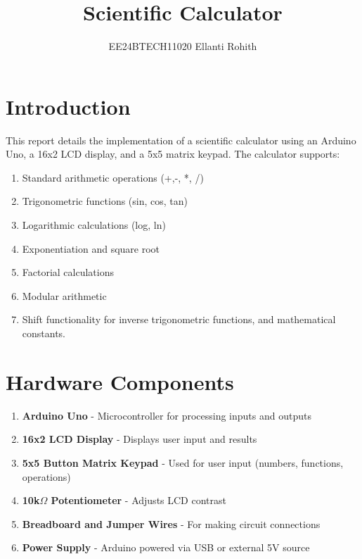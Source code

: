 \documentclass[journal,12pt,onecolumn]{IEEEtran}
\theoremstyle{remark}
\begin{document}

\vspace{3cm}

\title{Scientific Calculator}
\author{EE24BTECH11020    Ellanti Rohith}
\maketitle

\renewcommand{\thefigure}{\theenumi}
\renewcommand{\thetable}{\theenumi}



\section{Introduction}
This report details the implementation of a scientific calculator using an Arduino Uno, a 16x2 LCD display, and a 5x5 matrix keypad. The calculator supports:
\begin{enumerate}
    \item Standard arithmetic operations (+,-, *, /)
    \item Trigonometric functions (sin, cos, tan)
    \item Logarithmic calculations (log, ln)
    \item Exponentiation and square root
    \item Factorial calculations
    \item Modular arithmetic
    \item Shift functionality for inverse trigonometric functions, and mathematical constants.
\end{enumerate}

\section{Hardware Components}
\begin{enumerate}
    \item \textbf{Arduino Uno} - Microcontroller for processing inputs and outputs
    \item \textbf{16x2 LCD Display} - Displays user input and results
    \item \textbf{5x5 Button Matrix Keypad} - Used for user input (numbers, functions, operations)
    \item \textbf{10k$\Omega$ Potentiometer} - Adjusts LCD contrast
    \item \textbf{Breadboard and Jumper Wires} - For making circuit connections
    \item \textbf{Power Supply} - Arduino powered via USB or external 5V source
\end{enumerate}
\end{document}
